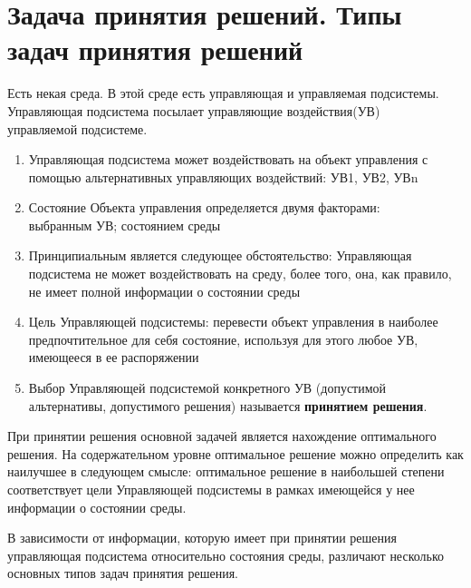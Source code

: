 \documentclass[17pt]{extarticle}
\begin{document}
\section{Задача принятия решений. Типы задач принятия решений}

Есть некая среда. В этой среде есть управляющая и управляемая подсистемы.
Управляющая подсистема посылает управляющие воздействия(УВ) \\ управляемой подсистеме.

\begin{enumerate}
    \item Управляющая подсистема может воздействовать на объект управления с помощью альтернативных управляющих воздействий: УВ1, УВ2, УВn
    \item Состояние Объекта управления определяется двумя факторами: \\ выбранным УВ; состоянием среды
    \item Принципиальным является следующее обстоятельство:
          Управляющая подсистема не может воздействовать на среду, более того, она, как правило, не имеет полной информации о состоянии среды
    \item Цель Управляющей подсистемы: перевести объект управления в наиболее предпочтительное для себя состояние,
          используя для этого любое УВ, имеющееся в ее распоряжении
    \item Выбор Управляющей подсистемой конкретного УВ (допустимой альтернативы, допустимого решения)
          называется \textbf{принятием решения}.
\end{enumerate}

При принятии решения основной задачей является нахождение оптимального решения.
На содержательном уровне оптимальное решение можно определить как наилучшее в следующем смысле:
оптимальное решение в наибольшей степени соответствует цели
Управляющей подсистемы в рамках имеющейся у нее информации о состоянии среды.

В зависимости от информации,
которую имеет при принятии решения \\ управляющая подсистема относительно состояния среды,
различают несколько основных типов задач принятия решения.
\end{document}
